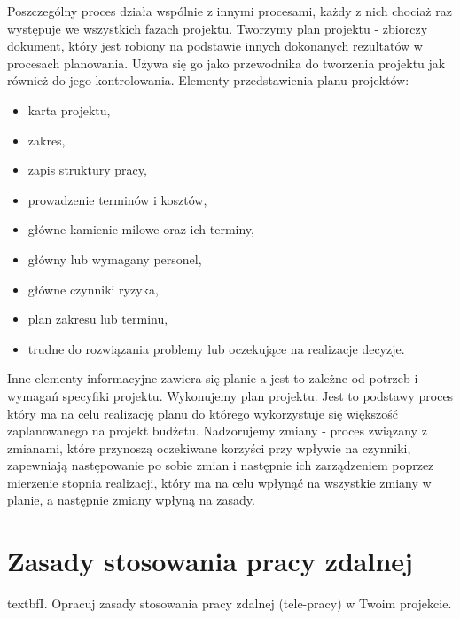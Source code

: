 Poszczególny proces działa wspólnie z innymi procesami, każdy z nich chociaż raz występuje we wszystkich fazach projektu.
Tworzymy plan projektu - zbiorczy dokument, który jest robiony na podstawie innych dokonanych rezultatów w procesach planowania. Używa się go jako przewodnika do tworzenia projektu jak również do jego kontrolowania.
Elementy przedstawienia planu projektów:

\begin{itemize}
\item karta projektu,
\item zakres,
\item zapis struktury pracy,
\item prowadzenie terminów i kosztów,
\item główne kamienie milowe oraz ich terminy,
\item główny lub wymagany personel,
\item główne czynniki ryzyka,
\item plan zakresu lub terminu,
\item trudne do rozwiązania problemy lub oczekujące na realizacje decyzje.
\end{itemize}

Inne elementy informacyjne zawiera się planie a jest to zależne od potrzeb i wymagań specyfiki projektu.
Wykonujemy plan projektu. Jest to podstawy proces który ma na celu realizację planu do którego wykorzystuje się większość zaplanowanego na projekt budżetu.
Nadzorujemy zmiany - proces związany z zmianami, które przynoszą oczekiwane korzyści przy wpływie na czynniki, zapewniają następowanie po sobie zmian i następnie ich zarządzeniem poprzez mierzenie stopnia realizacji, który ma na celu wpłynąć na wszystkie zmiany w planie, 
a następnie zmiany wpłyną na zasady.




\section{Zasady stosowania pracy zdalnej}

textbf{I. Opracuj zasady stosowania pracy zdalnej (tele-pracy) w Twoim projekcie.}

